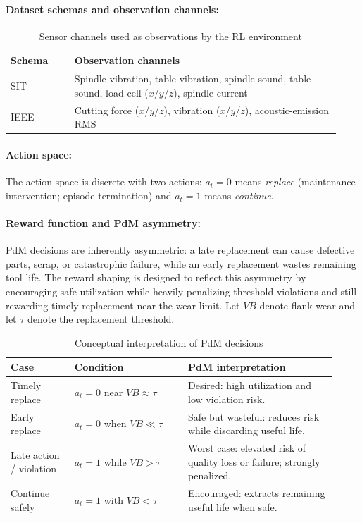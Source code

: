 \documentclass[sn-vancouver-num]{sn-jnl}%
\begin{document}
\paragraph{Dataset schemas and observation channels:}
\begin{table}[htbp]
\centering
\caption{Sensor channels used as observations by the RL environment}
\label{tab:schema_features}
	\begin{tabular}{L{0.18\linewidth} L{0.75\linewidth}}
	\toprule
	\textbf{Schema} & \textbf{Observation channels}\\
	\midrule
	SIT & Spindle vibration, table vibration, spindle sound, table sound, load-cell ($x$/$y$/$z$), spindle current\\
	IEEE & Cutting force ($x$/$y$/$z$), vibration ($x$/$y$/$z$), acoustic-emission RMS\\
	\bottomrule
	\end{tabular}
\end{table}

\paragraph{Action space:}
The action space is discrete with two actions: $a_t=0$ means \emph{replace} (maintenance intervention; episode termination) and $a_t=1$ means \emph{continue}. 

\paragraph{Reward function and PdM asymmetry:}
PdM decisions are inherently asymmetric: a late replacement can cause defective parts, scrap, or catastrophic failure, while an early replacement wastes remaining tool life. The reward shaping is designed to reflect this asymmetry by encouraging safe utilization while heavily penalizing threshold violations and still rewarding timely replacement near the wear limit. Let $VB$ denote flank wear and let $\tau$ denote the replacement threshold.

\begin{table}[htbp]
	\centering
	\caption{Conceptual interpretation of PdM decisions}
	\label{tab:cost_view}
	\begin{tabular}{L{0.18\linewidth} L{0.32\linewidth} L{0.42\linewidth}}
		\toprule
		\textbf{Case} & \textbf{Condition} & \textbf{PdM interpretation}\\
		\midrule
		Timely replace & $a_t=0$ near $VB\approx\tau$ & Desired: high utilization and low violation risk.\\
		Early replace & $a_t=0$ when $VB\ll\tau$ & Safe but wasteful: reduces risk while discarding useful life.\\
		Late action / violation & $a_t=1$ while $VB>\tau$ & Worst case: elevated risk of quality loss or failure; strongly penalized.\\
		Continue safely & $a_t=1$ with $VB<\tau$ & Encouraged: extracts remaining useful life when safe.\\
		\bottomrule
	\end{tabular}
\end{table}
\end{document}
